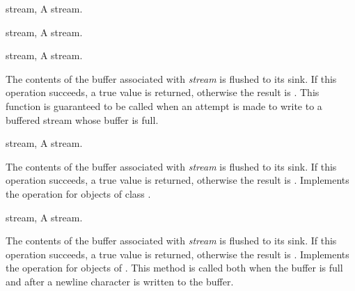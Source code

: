 \begin{optDefinition}
\begin{specargs}
    \item[stream, \classref{buffered-stream}] A stream.
\end{specargs}

\begin{specargs}
    \item[stream, \classref{file-stream}] A stream.
\end{specargs}

\begin{genericargs}
    \item[stream, \classref{buffered-stream}] A stream.
\end{genericargs}
%
\result%
The contents of the buffer associated with {\em stream} is flushed to
its sink. If this operation succeeds, a true value is returned, otherwise the
result is \nil.
%
\remarks%
This function is guaranteed to be called when an attempt is made to
write to a buffered stream whose buffer is full.

\begin{specargs}
    \item[stream, \classref{buffered-stream}] A stream.
\end{specargs}
%
\result%
The contents of the buffer associated with {\em stream} is flushed to
its sink. If this operation succeeds, a true value is returned, otherwise the
result is \nil.
%
\remarks%
Implements the  operation for objects of class
.

\begin{specargs}
    \item[stream, \classref{file-stream}] A stream.
\end{specargs}
%
\result%
The contents of the buffer associated with {\em stream} is flushed to
its sink. If this operation succeeds, a true value is returned, otherwise the
result is \nil.
%
\remarks%
Implements the  operation for objects of
. This method is called both when the buffer is full and
after a newline character is written to the buffer.


\end{optDefinition}
